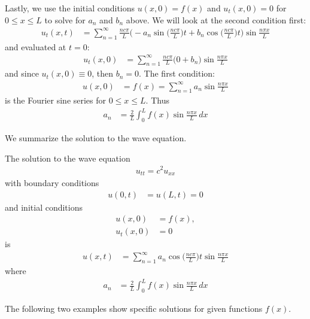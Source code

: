 Lastly, we use the initial conditions $u(x,0)=f(x)$  and $u_t(x,0)=0$  for $0 \leq x \leq L$ to solve for $a_n$ and $b_n$ above.  We will look at the second condition first:
%
\begin{align*}
u_t(x,t) & = \sum_{n=1}^{\infty} \frac{n c \pi}{L} \biggl( -a_n \sin \biggl( \frac{n c \pi }{L} \biggr) t + b_n \cos \biggl( \frac{n c \pi }{L} \biggr) t \biggr) \sin \frac{n \pi x}{L}
\end{align*}
and evaluated at $t=0$:
%
\begin{align*}
u_t(x,0) &= \sum_{n=1}^{\infty} \frac{n c \pi}{L} \biggl( 0 + b_n \biggr) \sin \frac{n \pi x}{L}
\end{align*}
and since $u_t(x,0)\equiv 0$, then $b_n=0$.  The first condition:
%
\begin{align*}
u(x,0) & = f(x) = \sum_{n=1}^{\infty}  a_n \sin \frac{n \pi x}{L}
\end{align*}
is the Fourier sine series for $0 \leq x \leq L$.   Thus
%
\begin{align*}
a_n & = \frac{2}{L} \int_{0}^L f(x) \sin \frac{n \pi x}{L} \, dx
\end{align*}

We summarize the solution to the wave equation.

\begin{Boxed*}
The solution to the wave equation
%
\begin{align*}
u_{tt} =c^2 u_{xx}
\end{align*}
with boundary conditions
%
\begin{align*}
u(0,t)& = u(L,t) = 0
\end{align*}
and initial conditions
\begin{align*}
u(x,0) & = f(x), \\
u_t(x,0) & = 0
\end{align*}
is
\begin{align*}
u(x,t) & = \sum_{n=1}^{\infty}  a_n \cos \biggl( \frac{n c \pi }{L} \biggr) t  \sin \frac{n \pi x}{L}
\end{align*}
where
%
\begin{align*}
a_n & = \frac{2}{L} \int_0^L f(x) \sin \frac{n\pi x}{L} \, dx
\end{align*}
\end{Boxed*}

\bigskip

The following two examples show specific solutions for given functions $f(x)$.



